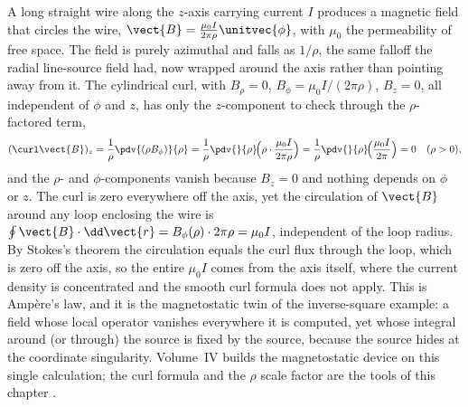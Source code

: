 \begin{example}
A long straight wire along the $z$-axis carrying current $I$ produces
a magnetic field that circles the wire, $\vect{B} = \frac{\mu_{0}I}
{2\pi\rho}\unitvec{\phi}$, with $\mu_{0}$ the permeability of free
space. The field is purely azimuthal and falls as $1/\rho$, the same
falloff the radial line-source field had, now wrapped around the axis
rather than pointing away from it. The cylindrical curl, with
$B_{\rho} = 0$, $B_{\phi} = \mu_{0}I/(2\pi\rho)$, $B_{z} = 0$, all
independent of $\phi$ and $z$, has only the $z$-component to check
through the $\rho$-factored term,
\[
(\curl\vect{B})_{z} = \frac{1}{\rho}\pdv{(\rho B_{\phi})}{\rho} =
\frac{1}{\rho}\pdv{}{\rho}\!\Big(\rho\cdot\frac{\mu_{0}I}{2\pi\rho}
\Big) = \frac{1}{\rho}\pdv{}{\rho}\!\Big(\frac{\mu_{0}I}{2\pi}\Big)
= 0 \quad(\rho > 0),
\]
and the $\rho$- and $\phi$-components vanish because $B_{z} = 0$ and
nothing depends on $\phi$ or $z$. The curl is zero everywhere off the
axis, yet the circulation of $\vect{B}$ around any loop enclosing the
wire is $\oint\vect{B}\cdot\dd\vect{r} = B_{\phi}(\rho)\cdot 2\pi\rho =
\mu_{0}I$, independent of the loop radius. By Stokes's theorem the
circulation equals the curl flux through the loop, which is zero off
the axis, so the entire $\mu_{0}I$ comes from the axis itself, where
the current density is concentrated and the smooth curl formula does
not apply. This is Ampère's law, and it is the magnetostatic twin of
the inverse-square example: a field whose local operator vanishes
everywhere it is computed, yet whose integral around (or through) the
source is fixed by the source, because the source hides at the
coordinate singularity. Volume~IV builds the magnetostatic device on
this single calculation; the curl formula and the $\rho$ scale factor
are the tools of this chapter
\cite{text:v2ch08-griffiths-em-2017}.
\end{example}

